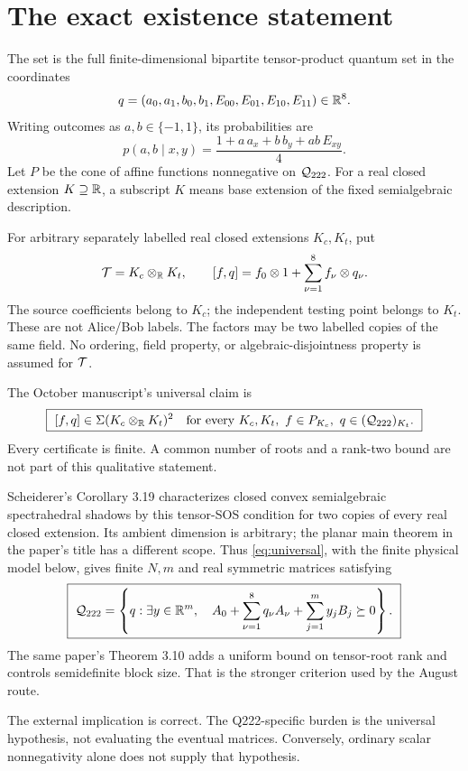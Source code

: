 \section{The exact existence statement}

The set is the full finite-dimensional bipartite tensor-product quantum
set in the coordinates
\[
 q=(a_0,a_1,b_0,b_1,E_{00},E_{01},E_{10},E_{11})\in\mathbb R^8.
\]
Writing outcomes as \(a,b\in\{-1,1\}\), its probabilities are
\[
 p(a,b\mid x,y)=\frac{1+a\,a_x+b\,b_y+ab\,E_{xy}}4.
\]
Let \(P\) be the cone of affine functions nonnegative on \(\mathcal Q_{222}\).
For a real closed extension \(K\supseteq\mathbb R\), a subscript \(K\) means
base extension of the fixed semialgebraic description.

For arbitrary separately labelled real closed extensions \(K_c,K_t\),
put
\[
 \mathcal T=K_c\otimes_{\mathbb R}K_t,\qquad
 [f,q]=f_0\otimes1+\sum_{\nu=1}^{8}f_\nu\otimes q_\nu.
\]
The source coefficients belong to \(K_c\); the independent testing point
belongs to \(K_t\). These are not Alice/Bob labels. The factors may be
two labelled copies of the same field. No ordering, field property, or
algebraic-disjointness property is assumed for \(\mathcal T\).

The October manuscript's universal claim is
\begin{equation}
 \boxed{\ 
 [f,q]\in\Sigma(K_c\otimes_{\R}K_t)^2
 \quad\text{for every }K_c,K_t,\ f\in P_{K_c},\ q\in(\Q)_{K_t}.
 \ }
 \label{eq:universal}
\end{equation}
Every certificate is finite. A common number of roots and a rank-two
bound are not part of this qualitative statement.

Scheiderer's Corollary 3.19 characterizes closed convex semialgebraic
spectrahedral shadows by this tensor-SOS condition for two copies of
every real closed extension. Its ambient dimension is arbitrary; the
planar main theorem in the paper's title has a different scope.
Thus \eqref{eq:universal}, with the finite physical model below, gives
finite \(N,m\) and real symmetric matrices satisfying
\begin{equation}
 \boxed{\ 
 \Q=\left\{q:\exists y\in\R^m,\quad
 A_0+\sum_{\nu=1}^{8}q_\nu A_\nu+
       \sum_{j=1}^{m}y_jB_j\succeq0\right\}.
 \ }
 \label{eq:lift}
\end{equation}
The same paper's Theorem 3.10 adds a uniform bound on tensor-root rank
and controls semidefinite block size. That is the stronger criterion
used by the August route. \src{S1}

The external implication is correct. The Q222-specific burden is the
universal hypothesis, not evaluating the eventual matrices.
Conversely, ordinary scalar nonnegativity alone does not supply that
hypothesis.

